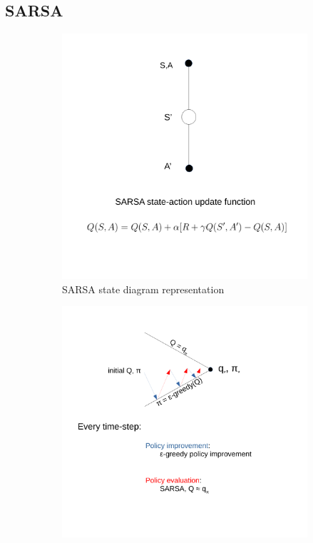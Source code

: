 \subsection{SARSA}
\begin{figure}[!htb]
	\begin{subfigure}{.5\textwidth}
		\centering
		\includegraphics[width=1\linewidth]{RL/fig/sarsa_state_diagram.pdf}
		\caption{SARSA state diagram representation\cite{David_Silver}}
		\label{fig:sarsa_state_diagram}
	\end{subfigure}
	\begin{subfigure}{.49\textwidth}
		\centering
		\includegraphics[width=1\linewidth]{RL/fig/sarsa_on_policy_control.pdf}

\end{subfigure}
\end{figure}
